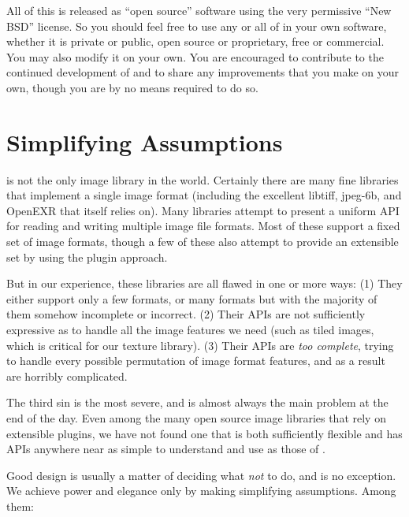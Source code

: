 All of this is released as ``open source'' software using the very
permissive ``New BSD'' license.  So you should feel free to use any or all of
\product in your own software, whether it is private or public, open
source or proprietary, free or commercial.  You may also modify it on
your own.  You are encouraged to contribute to the continued
development of \product and to share any improvements that you make on
your own, though you are by no means required to do so.

\section{Simplifying Assumptions}

\product is not the only image library in the world.  Certainly there
are many fine libraries that implement a single image format (including
the excellent {\fn libtiff}, {\fn jpeg-6b}, and {\fn OpenEXR} that
\product itself relies on).  Many libraries attempt to present a uniform
API for reading and writing multiple image file formats.  Most of these
support a fixed set of image formats, though a few of these
also attempt to provide an extensible set by using the plugin approach.

But in our experience, these libraries are all flawed in one or more
ways: (1) They either support only a few formats, or many formats but
with the majority of them somehow incomplete or incorrect.  (2) Their
APIs are not sufficiently expressive as to handle all the image features
we need (such as tiled images, which is critical for our texture
library).  (3) Their APIs are \emph{too complete}, trying to handle
every possible permutation of image format features, and as a result
are horribly complicated.

The third sin is the most severe, and is almost always the main problem
at the end of the day.  Even among the many open source image libraries
that rely on extensible plugins, we have not found one that is both
sufficiently flexible and has APIs anywhere near as simple to understand
and use as those of \product.

Good design is usually a matter of deciding what \emph{not} to do, and
\product is no exception.  We achieve power and elegance only by
making simplifying assumptions.  Among them:

